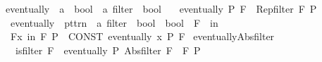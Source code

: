 \begin{isabellebody}
\endisatagproof
{\isafoldproof}%
%
\isadelimproof
%
\endisadelimproof
%
\isadelimdocument
%
\endisadelimdocument
%
\isatagdocument
%
\isamarkuptrue%
%
\endisatagdocument
{\isafolddocument}%
%
\isadelimdocument
%
\endisadelimdocument
{}\isamarkupfalse%
\ eventually\ {\isacharcolon}{\kern0pt}{\isacharcolon}{\kern0pt}\ {\isachardoublequoteopen}{\isacharparenleft}{\kern0pt}{\isacharprime}{\kern0pt}a\ {\isasymRightarrow}\ bool{\isacharparenright}{\kern0pt}\ {\isasymRightarrow}\ {\isacharprime}{\kern0pt}a\ filter\ {\isasymRightarrow}\ bool{\isachardoublequoteclose}\isanewline
\ \ \ {\isachardoublequoteopen}eventually\ P\ F\ {\isasymlongleftrightarrow}\ Rep{\isacharunderscore}{\kern0pt}filter\ F\ P{\isachardoublequoteclose}\isanewline
\isanewline
{}\isamarkupfalse%
\isanewline
\ \ {\isachardoublequoteopen}{\isacharunderscore}{\kern0pt}eventually{\isachardoublequoteclose}\ {\isacharcolon}{\kern0pt}{\isacharcolon}{\kern0pt}\ {\isachardoublequoteopen}pttrn\ {\isacharequal}{\kern0pt}{\isachargreater}{\kern0pt}\ {\isacharprime}{\kern0pt}a\ filter\ {\isacharequal}{\kern0pt}{\isachargreater}{\kern0pt}\ bool\ {\isacharequal}{\kern0pt}{\isachargreater}{\kern0pt}\ bool{\isachardoublequoteclose}\ \ {\isacharparenleft}{\kern0pt}{\isachardoublequoteopen}{\isacharparenleft}{\kern0pt}{}{\isasymforall}\isactrlsub F\ {\isacharunderscore}{\kern0pt}\ in\ {\isacharunderscore}{\kern0pt}{\isachardot}{\kern0pt}{\isacharslash}{\kern0pt}\ {\isacharunderscore}{\kern0pt}{\isacharparenright}{\kern0pt}{\isachardoublequoteclose}\ {\isacharbrackleft}{\kern0pt}{}{\isacharcomma}{\kern0pt}\ {}{\isacharcomma}{\kern0pt}\ {}{}{\isacharbrackright}{\kern0pt}\ {}{}{\isacharparenright}{\kern0pt}\isanewline
{}\isamarkupfalse%
\isanewline
\ \ {\isachardoublequoteopen}{\isasymforall}\isactrlsub Fx\ in\ F{\isachardot}{\kern0pt}\ P{\isachardoublequoteclose}\ {\isacharequal}{\kern0pt}{\isacharequal}{\kern0pt}\ {\isachardoublequoteopen}CONST\ eventually\ {\isacharparenleft}{\kern0pt}{\isasymlambda}x{\isachardot}{\kern0pt}\ P{\isacharparenright}{\kern0pt}\ F{\isachardoublequoteclose}\isanewline
\isanewline
{}\isamarkupfalse%
\ eventually{\isacharunderscore}{\kern0pt}Abs{\isacharunderscore}{\kern0pt}filter{\isacharcolon}{\kern0pt}\isanewline
\ \ \ {\isachardoublequoteopen}is{\isacharunderscore}{\kern0pt}filter\ F{\isachardoublequoteclose}\ \ {\isachardoublequoteopen}eventually\ P\ {\isacharparenleft}{\kern0pt}Abs{\isacharunderscore}{\kern0pt}filter\ F{\isacharparenright}{\kern0pt}\ {\isacharequal}{\kern0pt}\ F\ P{\isachardoublequoteclose}\isanewline

\end{isabellebody}
